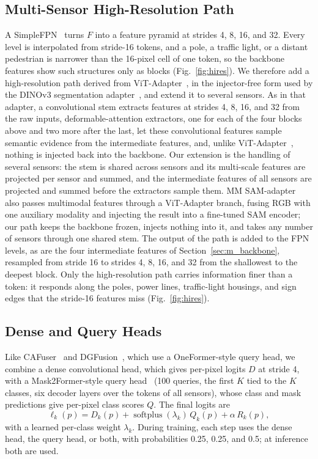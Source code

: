 \subsection{Multi-Sensor High-Resolution Path}\label{sec:m_decoder}
A SimpleFPN~\cite{vitdet2022} turns $F$ into a feature pyramid at strides 4, 8, 16, and 32. Every level is interpolated from stride-16 tokens, and a pole, a traffic light, or a distant pedestrian is narrower than the 16-pixel cell of one token, so the backbone features show such structures only as blocks (Fig.~\ref{fig:hires}). We therefore add a high-resolution path derived from ViT-Adapter~\cite{vitadapter2023}, in the injector-free form used by the DINOv3 segmentation adapter~\cite{dinov3_2025}, and extend it to several sensors. As in that adapter, a convolutional stem extracts features at strides 4, 8, 16, and 32 from the raw inputs, deformable-attention extractors, one for each of the four blocks above and two more after the last, let these convolutional features sample semantic evidence from the intermediate features, and, unlike ViT-Adapter~\cite{vitadapter2023}, nothing is injected back into the backbone. Our extension is the handling of several sensors: the stem is shared across sensors and its multi-scale features are projected per sensor and summed, and the intermediate features of all sensors are projected and summed before the extractors sample them. MM SAM-adapter~\cite{mmsamadapter2025} also passes multimodal features through a ViT-Adapter branch, fusing RGB with one auxiliary modality and injecting the result into a fine-tuned SAM encoder; our path keeps the backbone frozen, injects nothing into it, and takes any number of sensors through one shared stem. The output of the path is added to the FPN levels, as are the four intermediate features of Section~\ref{sec:m_backbone}, resampled from stride 16 to strides 4, 8, 16, and 32 from the shallowest to the deepest block. Only the high-resolution path carries information finer than a token: it responds along the poles, power lines, traffic-light housings, and sign edges that the stride-16 features miss (Fig.~\ref{fig:hires}).

\subsection{Dense and Query Heads}\label{sec:m_heads}
Like CAFuser~\cite{cafuser2025} and DGFusion~\cite{dgfusion2026}, which use a OneFormer-style query head, we combine a dense convolutional head, which gives per-pixel logits $D$ at stride 4, with a Mask2Former-style query head~\cite{mask2former2022} (100 queries, the first $K$ tied to the $K$ classes, six decoder layers over the tokens of all sensors), whose class and mask predictions give per-pixel class scores $Q$. The final logits are
\begin{equation}
\ell_k(p) = D_k(p) + \operatorname{softplus}(\lambda_k)\, Q_k(p) + \alpha\, R_k(p),
\end{equation}
with a learned per-class weight $\lambda_k$. During training, each step uses the dense head, the query head, or both, with probabilities 0.25, 0.25, and 0.5; at inference both are used.

